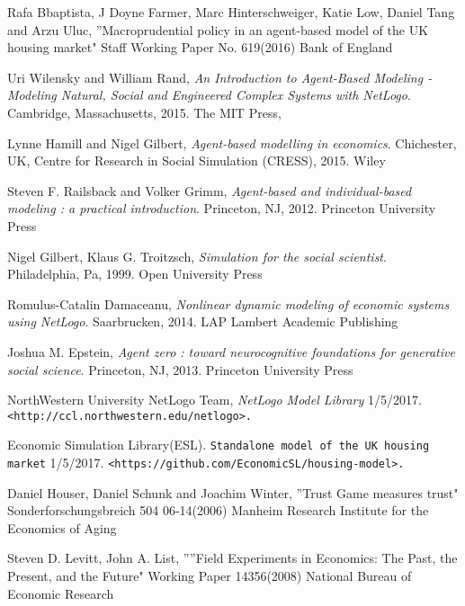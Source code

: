 \documentclass[11pt]{article}
\begin{document}
\pagebreak
\begin{thebibliography}{}


Rafa Bbaptista, J Doyne Farmer, Marc Hinterschweiger, Katie Low, Daniel Tang and Arzu Uluc,
''Macroprudential policy in an agent-based model of the UK housing market"
Staff Working Paper No. 619(2016)
Bank of England

Uri Wilensky and William Rand,
\textit{An Introduction to Agent-Based Modeling - Modeling Natural, Social and Engineered Complex Systems with NetLogo}.
Cambridge, Massachusetts,
2015.
The MIT Press,

Lynne Hamill and Nigel Gilbert,
\textit{Agent-based modelling in economics}.
Chichester, UK,
Centre for Research in Social Simulation (CRESS),
2015.
Wiley

Steven F. Railsback and Volker Grimm,
\textit{Agent-based and individual-based modeling : a practical introduction}.
Princeton, NJ,
2012.
Princeton University Press

Nigel Gilbert, Klaus G. Troitzsch,
\textit{Simulation for the social scientist}.
Philadelphia, Pa,
1999.
Open University Press

Romulus-Catalin Damaceanu,
\textit{Nonlinear dynamic modeling of economic systems using NetLogo}.
Saarbrucken,
2014.
LAP Lambert Academic Publishing

Joshua M. Epstein,
\textit{Agent zero : toward neurocognitive foundations for generative social science}.
Princeton, NJ,
2013.
Princeton University Press

NorthWestern University NetLogo Team,
\textit{NetLogo Model Library}
1/5/2017.
\texttt{<http://ccl.northwestern.edu/netlogo>.}

Economic Simulation Library(ESL).
\texttt{Standalone model of the UK housing market}
1/5/2017.
\texttt{<https://github.com/EconomicSL/housing-model>.}

Daniel Houser, Daniel Schunk and Joachim Winter,
''Trust Game measures trust"
Sonderforschungsbreich 504 06-14(2006)
Manheim Research Institute for the Economics of Aging

Steven D. Levitt, John A. List,
''”Field Experiments in Economics: The Past, the Present,
and the Future"
Working Paper 14356(2008) 
National Bureau of Economic Research


\end{thebibliography}
\end{document}
